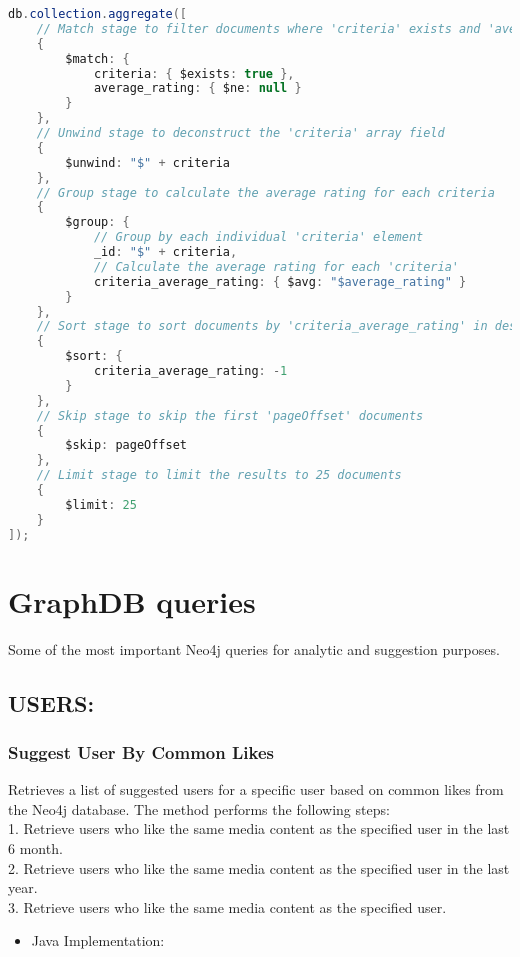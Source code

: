 \begin{mdframed}[style=customstyle]
\begin{lstlisting}[language=java]
db.collection.aggregate([
    // Match stage to filter documents where 'criteria' exists and 'average_rating' is not null
    {
        $match: {
            criteria: { $exists: true },
            average_rating: { $ne: null }
        }
    },
    // Unwind stage to deconstruct the 'criteria' array field
    {
        $unwind: "$" + criteria
    },
    // Group stage to calculate the average rating for each criteria
    {
        $group: {
            // Group by each individual 'criteria' element
            _id: "$" + criteria,
            // Calculate the average rating for each 'criteria'
            criteria_average_rating: { $avg: "$average_rating" }
        }
    },
    // Sort stage to sort documents by 'criteria_average_rating' in descending order
    {
        $sort: {
            criteria_average_rating: -1
        }
    },
    // Skip stage to skip the first 'pageOffset' documents
    {
        $skip: pageOffset
    },
    // Limit stage to limit the results to 25 documents
    {
        $limit: 25
    }
]);
\end{lstlisting}
\end{mdframed}
  
\vspace{\baselineskip}

\section{GraphDB queries}
Some of the most important Neo4j queries for analytic and suggestion purposes.
\subsection*{USERS:}
\subsubsection*{Suggest User By Common Likes}

Retrieves a list of suggested users for a specific user based on common likes from the Neo4j database.
The method performs the following steps:\\
1. Retrieve users who like the same media content as the specified user in the last 6 month.\\
2. Retrieve users who like the same media content as the specified user in the last year.\\
3. Retrieve users who like the same media content as the specified user.\\
\begin{itemize}
    \item Java Implementation:
\end{itemize}

